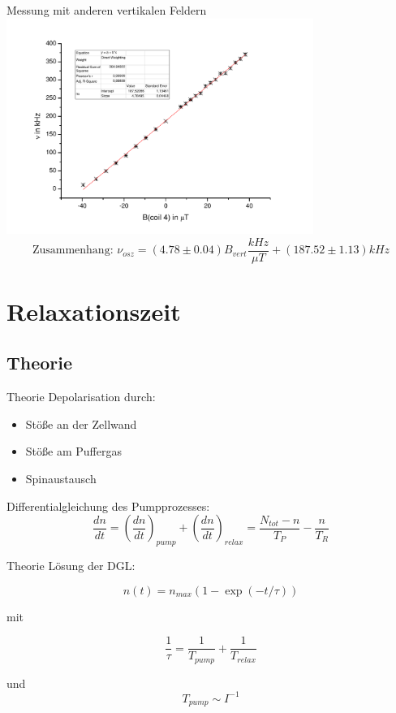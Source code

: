 \documentclass{beamer}
\begin{document}
\begin{frame}{Messung mit anderen vertikalen Feldern}
\centering \includegraphics[width=0.75\textwidth]{Bilder/praezfeld.pdf}
$$\text{Zusammenhang: } \nu_{osz} = (4.78\pm0.04)B_{vert} \frac{kHz}{\mu T} + (187.52 \pm 1.13)kHz$$
\end{frame}

\section{Relaxationszeit}
\begin{frame}
\begin{center}
\end{center}
\end{frame}

\subsection{Theorie}
\begin{frame}{Theorie}
Depolarisation durch:
\begin{itemize}
\item Stöße an der Zellwand
\item Stöße am Puffergas
\item Spinaustausch
\end{itemize}

Differentialgleichung des Pumpprozesses:
 $$\frac{dn}{dt} = \left(\frac{dn}{dt}\right)_{pump} + \left(\frac{dn}{dt}\right)_{relax} = \frac{N_{tot}-n}{T_P} - \frac{n}{T_R}$$ %
\end{frame}

\begin{frame}{Theorie}
Lösung der DGL:

$$n(t) = n_{max}(1-\exp(-t/\tau))$$

mit

$$\frac{1}{\tau} = \frac{1}{T_{pump}} + \frac{1}{T_{relax}}$$ %

und $$T_{pump} \sim I^{-1}$$ %

\end{frame}
\end{document}
